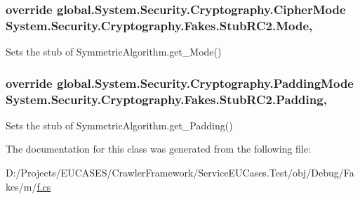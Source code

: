\hypertarget{class_system_1_1_security_1_1_cryptography_1_1_fakes_1_1_stub_r_c2_abf2fc1832a62594aafefac68fec9a365}{
\subsubsection[{Mode}]{\setlength{\rightskip}{0pt plus 5cm}override global.\-System.\-Security.\-Cryptography.\-Cipher\-Mode System.\-Security.\-Cryptography.\-Fakes.\-Stub\-R\-C2.\-Mode\hspace{0.3cm}{\ttfamily [get]}, {\ttfamily [set]}}}\label{class_system_1_1_security_1_1_cryptography_1_1_fakes_1_1_stub_r_c2_abf2fc1832a62594aafefac68fec9a365}


Sets the stub of Symmetric\-Algorithm.\-get\-\_\-\-Mode()

\hypertarget{class_system_1_1_security_1_1_cryptography_1_1_fakes_1_1_stub_r_c2_a8ecc1d77fcc4a386c523fce9637932a1}{
\subsubsection[{Padding}]{\setlength{\rightskip}{0pt plus 5cm}override global.\-System.\-Security.\-Cryptography.\-Padding\-Mode System.\-Security.\-Cryptography.\-Fakes.\-Stub\-R\-C2.\-Padding\hspace{0.3cm}{\ttfamily [get]}, {\ttfamily [set]}}}\label{class_system_1_1_security_1_1_cryptography_1_1_fakes_1_1_stub_r_c2_a8ecc1d77fcc4a386c523fce9637932a1}


Sets the stub of Symmetric\-Algorithm.\-get\-\_\-\-Padding()



The documentation for this class was generated from the following file\-:\begin{DoxyCompactItemize}
\item 
D\-:/\-Projects/\-E\-U\-C\-A\-S\-E\-S/\-Crawler\-Framework/\-Service\-E\-U\-Cases.\-Test/obj/\-Debug/\-Fakes/m/\hyperlink{m_2f_8cs}{f.\-cs}\end{DoxyCompactItemize}
